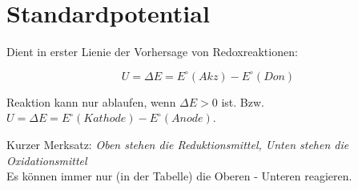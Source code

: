 
\section{Standardpotential}

Dient in erster Lienie der Vorhersage von Redoxreaktionen:

\[
    U = \Delta E = E^\circ (Akz) - E^\circ (Don)
\]

Reaktion kann nur ablaufen, wenn $\Delta E > 0$ ist. Bzw. $U = \Delta E = E^\circ(Kathode) - E^\circ(Anode)$.

Kurzer Merksatz: \textit{Oben stehen die Reduktionsmittel, Unten stehen die Oxidationsmittel} \\
Es können immer nur (in der Tabelle) die Oberen - Unteren reagieren.


